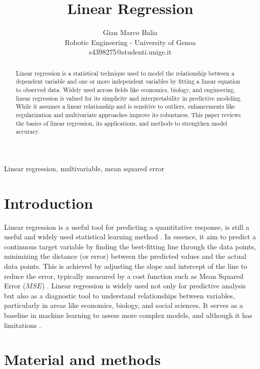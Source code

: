 \documentclass[9pt,technote]{IEEEtran}
\title{Linear Regression}
\author{
	Gian Marco Balia\\
	Robotic Engineering - University of Genoa\\
	s4398275@studenti.unige.it
}
\begin{document}
	\maketitle
	\begin{abstract}
Linear regression is a statistical technique used to model the relationship between a dependent variable and one or more independent variables by fitting a linear equation to observed data. Widely used across fields like economics, biology, and engineering, linear regression is valued for its simplicity and interpretability in predictive modeling. While it assumes a linear relationship and is sensitive to outliers, enhancements like regularization and multivariate approaches improve its robustness. This paper reviews the basics of linear regression, its applications, and methods to strengthen model accuracy.
	\end{abstract}
	\begin{IEEEkeywords}
Linear regression, multivariable, mean squared error
	\end{IEEEkeywords}
	\section{Introduction}
Linear regression is a useful tool for predicting a quantitative response, is still a useful and widely used statistical learning method \cite{james2023linear}.
In essence, it aim to predict a continuous target variable by finding the best-fitting line through the data points, minimizing the distance (or error) between the predicted values and the actual data points. This is achieved by adjusting the slope and intercept of the line to reduce the error, typically measured by a cost function such as Mean Squared Error ($MSE$) \cite{Montgomery}.
Linear regression is widely used not only for predictive analysis but also as a diagnostic tool to understand relationships between variables, particularly in areas like economics, biology, and social sciences. It serves as a baseline in machine learning to assess more complex models, and although it has limitations \cite{James}.
 
	\section{Material and methods}
 
\end{document}
